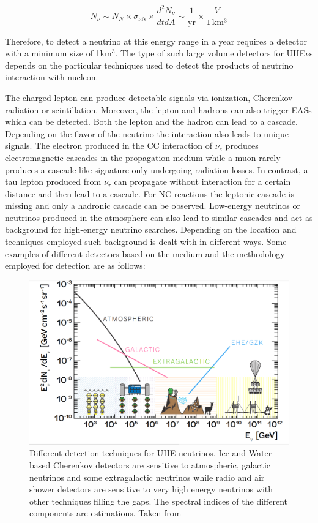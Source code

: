 \begin{equation}
  N_{\nu} \sim N_N \times \sigma_{\nu N} \times \frac{d^2N_{\nu}}{dt dA} \sim \frac{1}{\text{yr}} \times \frac{V}{1\,\mathrm{km^3}}
\end{equation}

Therefore, to detect a neutrino at this energy range in a year requires a detector with a minimum size of 1km$^3$. The type of such large volume detectors for UHE$\nu$s depends on the particular techniques used to detect the products of neutrino interaction with nucleon. 

The charged lepton can produce detectable signals via ionization, Cherenkov radiation or scintillation. Moreover, the lepton and hadrons can also trigger EASs which can be detected. Both the lepton and the hadron can lead to a cascade. Depending on the flavor of the neutrino the interaction also leads to unique signals. The electron produced in the CC interaction of $\nu_e$ produces electromagnetic cascades in the propagation medium while a muon rarely produces a cascade like signature only undergoing radiation losses. In contrast, a tau lepton produced from $\nu_{\tau}$ can propagate without interaction for a certain distance and then lead to a cascade. For NC reactions the leptonic cascade is missing and only a hadronic cascade can be observed. Low-energy neutrinos or neutrinos produced in the atmosphere can also lead to similar cascades and act as background for high-energy neutrino searches. Depending on the location and techniques employed such background is dealt with in different ways. Some examples of different detectors based on the medium and the methodology employed for detection are as follows:

\begin{figure}[t!]
  \centering
  \includegraphics[width=14.5cm]{thesis_figures/CRnNu/UHE_nu_techniques.png}
  \caption{Different detection techniques for UHE neutrinos. Ice and Water based Cherenkov detectors are sensitive to atmospheric, galactic neutrinos and some extragalactic neutrinos while radio and air shower detectors are sensitive to very high energy neutrinos with other techniques filling the gaps. The spectral indices of the different components are estimations. Taken from~\cite{Arguelles:2024xkx}}
  \label{fig:UHE-nu-techniques}
\end{figure}

